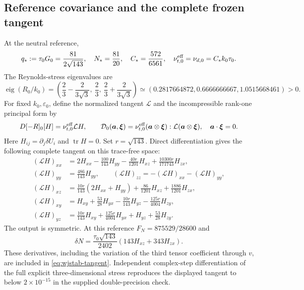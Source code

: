 \documentclass[11pt,a4paper]{article}
\numberwithin{equation}{section}
\begin{document}
\subsection{Reference covariance and the complete frozen tangent}

At the neutral reference,
\begin{equation}
 q_*:=\tau_0G_0=\frac{81}{2\sqrt{143}},\quad
 N_*=\frac{81}{20},\quad C_*=\frac{572}{6561},\quad
 \nu_{t,0}^{\rm eff}=\nu_{d,0}=C_*k_0\tau_0.
 \label{eq:wjstab-reference}
\end{equation}
The Reynolds-stress eigenvalues are
\begin{equation}
 \operatorname{eig}(R_0/k_0)
 =\left(\frac23-\frac{2}{3\sqrt3},\ \frac23,\
              \frac23+\frac{2}{3\sqrt3}\right)
 \simeq(0.2817664872,0.6666666667,1.0515668461)>0.
 \label{eq:wjstab-ref-realizability}
\end{equation}
For fixed $k_0,\varepsilon_0$, define the normalized tangent
$\mathcal L$ and the incompressible rank-one principal form by
\begin{equation}
 D[-R]_0[H]=\nu_{t,0}^{\rm eff}\mathcal LH,\qquad
 \mathcal D_0(\boldsymbol a,\boldsymbol\xi)
 =\nu_{t,0}^{\rm eff}
   (\boldsymbol a\otimes\boldsymbol\xi):
   \mathcal L(\boldsymbol a\otimes\boldsymbol\xi),
 \quad\boldsymbol a\cdot\boldsymbol\xi=0.
 \label{eq:wjstab-principal}
\end{equation}
Here $H_{ij}=\partial_j\delta U_i$ and $\operatorname{tr}H=0$.
Set $r=\sqrt{143}$. Direct differentiation gives the following complete
tangent on this trace-free space:
\begin{align}
 (\mathcal LH)_{xx}&=2H_{xx}-\frac{100}{143}H_{yy}
                 -\frac{40r}{1201}H_{xz}
                 +\frac{10300r}{171743}H_{zx},\nonumber\\
 (\mathcal LH)_{yy}&=\frac{486}{143}H_{yy},\qquad
 (\mathcal LH)_{zz}=-(\mathcal LH)_{xx}-(\mathcal LH)_{yy},\nonumber\\
 (\mathcal LH)_{xz}&=\frac{10r}{143}(2H_{xx}+H_{yy})
                    +\frac{86}{1201}H_{xz}
                    +\frac{1886}{1201}H_{zx},\nonumber\\
 (\mathcal LH)_{xy}&=H_{xy}+\frac{53}{28}H_{yx}
                 -\frac{10r}{143}H_{yz}-\frac{125r}{4004}H_{zy},\nonumber\\
 (\mathcal LH)_{yz}&=\frac{10r}{143}H_{xy}
                   +\frac{125r}{4004}H_{yx}
                   +H_{yz}+\frac{53}{28}H_{zy}.
 \label{eq:wjstab-tangent}
\end{align}
The output is symmetric. At this reference
$F_N=875529/28600$ and
\begin{equation}
 \delta N=\frac{\tau_0\sqrt{143}}{2402}
                      (143H_{xz}+343H_{zx}).
 \label{eq:wjstab-dN-ref}
\end{equation}
These derivatives, including the variation of the third tensor
coefficient through $v$, are included in \eqref{eq:wjstab-tangent}.
Independent complex-step differentiation of the full explicit
three-dimensional stress reproduces the displayed tangent to below
$2\times10^{-15}$ in the supplied double-precision check.
\end{document}
